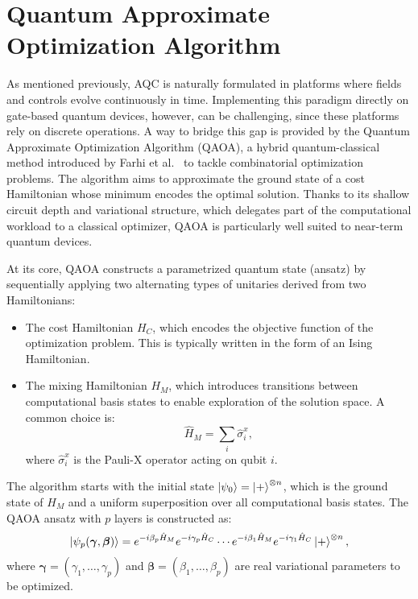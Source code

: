 \section{Quantum Approximate Optimization Algorithm}
\label{Section:QAOA}

As mentioned previously, AQC is naturally formulated in platforms where fields and controls evolve continuously in time. Implementing this paradigm directly on gate-based quantum devices, however, can be challenging, since these platforms rely on discrete operations. A way to bridge this gap is provided by the Quantum Approximate Optimization Algorithm (QAOA), a hybrid quantum-classical method introduced by Farhi et al.~\cite{farhi_quantum_2014} to tackle combinatorial optimization problems. The algorithm aims to approximate the ground state of a cost Hamiltonian whose minimum encodes the optimal solution. Thanks to its shallow circuit depth and variational structure, which delegates part of the computational workload to a classical optimizer, QAOA is particularly well suited to near-term quantum devices.

At its core, QAOA constructs a parametrized quantum state (ansatz) by sequentially applying two alternating types of unitaries derived from two Hamiltonians:
\begin{itemize}
    \item The cost Hamiltonian $H_C$, which encodes the objective function of the optimization
    problem. This is typically written in the form of an Ising Hamiltonian.
    \item The mixing Hamiltonian $H_M$, which introduces transitions between computational
    basis states to enable exploration of the solution space. A common choice is:
    \begin{equation}
        \hat{H}_M = \sum_i \hat{\sigma}_i^x,
        \label{eq:mixing_hamiltonian}
    \end{equation}
    where $\hat{\sigma}_i^x$ is the Pauli-X operator acting on qubit $i$.
\end{itemize}

The algorithm starts with the initial state $\ket{\psi_0} = \ket{+}^{\otimes n}$, which is the ground state of $H_M$ and a uniform superposition over all computational basis states. The QAOA ansatz with $p$ layers is constructed as:
\begin{equation}
    \ket{\psi_p(\bm{\gamma}, \bm{\beta})} = e^{-i \beta_p \hat{H}_M} e^{- i \gamma_p \hat{H}_C} \cdots
    e^{-i \beta_1 \hat{H}_M} e^{- i \gamma_1 \hat{H}_C} \ket{+}^{\otimes n},
    \label{eq:qaoa_state_evolution}
\end{equation}
where $\bm{\gamma} = (\gamma_1, \dots, \gamma_p)$ and $\bm{\beta} = (\beta_1, \dots, \beta_p)$ are real variational parameters to be optimized.

